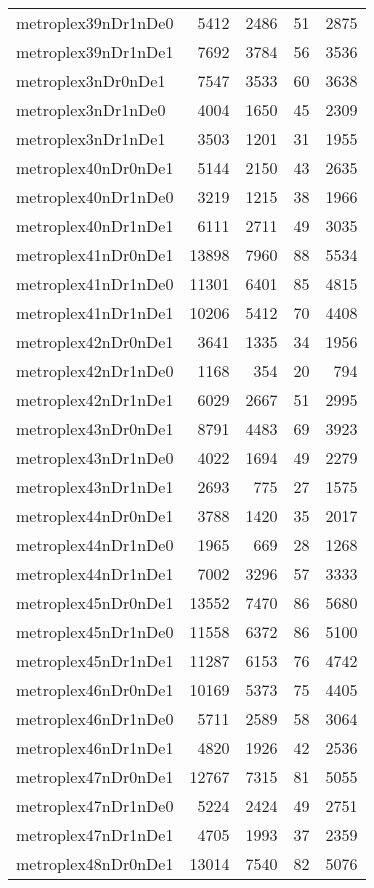 \begin{longtable}{lrrrr}
metroplex39nDr1nDe0 & 5412 & 2486 & 51 & 2875 \\
metroplex39nDr1nDe1 & 7692 & 3784 & 56 & 3536 \\
metroplex3nDr0nDe1 & 7547 & 3533 & 60 & 3638 \\
metroplex3nDr1nDe0 & 4004 & 1650 & 45 & 2309 \\
metroplex3nDr1nDe1 & 3503 & 1201 & 31 & 1955 \\
metroplex40nDr0nDe1 & 5144 & 2150 & 43 & 2635 \\
metroplex40nDr1nDe0 & 3219 & 1215 & 38 & 1966 \\
metroplex40nDr1nDe1 & 6111 & 2711 & 49 & 3035 \\
metroplex41nDr0nDe1 & 13898 & 7960 & 88 & 5534 \\
metroplex41nDr1nDe0 & 11301 & 6401 & 85 & 4815 \\
metroplex41nDr1nDe1 & 10206 & 5412 & 70 & 4408 \\
metroplex42nDr0nDe1 & 3641 & 1335 & 34 & 1956 \\
metroplex42nDr1nDe0 & 1168 & 354 & 20 & 794 \\
metroplex42nDr1nDe1 & 6029 & 2667 & 51 & 2995 \\
metroplex43nDr0nDe1 & 8791 & 4483 & 69 & 3923 \\
metroplex43nDr1nDe0 & 4022 & 1694 & 49 & 2279 \\
metroplex43nDr1nDe1 & 2693 & 775 & 27 & 1575 \\
metroplex44nDr0nDe1 & 3788 & 1420 & 35 & 2017 \\
metroplex44nDr1nDe0 & 1965 & 669 & 28 & 1268 \\
metroplex44nDr1nDe1 & 7002 & 3296 & 57 & 3333 \\
metroplex45nDr0nDe1 & 13552 & 7470 & 86 & 5680 \\
metroplex45nDr1nDe0 & 11558 & 6372 & 86 & 5100 \\
metroplex45nDr1nDe1 & 11287 & 6153 & 76 & 4742 \\
metroplex46nDr0nDe1 & 10169 & 5373 & 75 & 4405 \\
metroplex46nDr1nDe0 & 5711 & 2589 & 58 & 3064 \\
metroplex46nDr1nDe1 & 4820 & 1926 & 42 & 2536 \\
metroplex47nDr0nDe1 & 12767 & 7315 & 81 & 5055 \\
metroplex47nDr1nDe0 & 5224 & 2424 & 49 & 2751 \\
metroplex47nDr1nDe1 & 4705 & 1993 & 37 & 2359 \\
metroplex48nDr0nDe1 & 13014 & 7540 & 82 & 5076 \\

\end{longtable}
